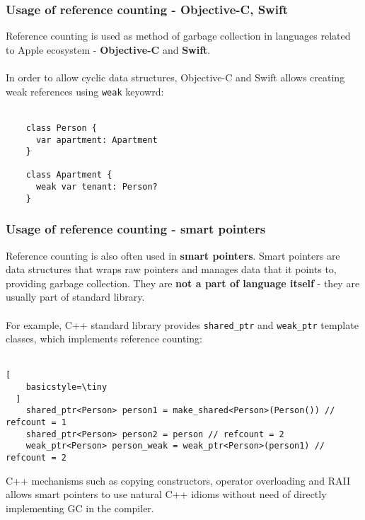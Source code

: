 \documentclass[presentation]{beamer}
\begin{document}
\begin{frame}[fragile]
  \frametitle{Usage of reference counting - Objective-C, Swift} 
  \justifying
  Reference counting is used as method of garbage collection in languages related to Apple ecosystem - \textbf{Objective-C} and \textbf{Swift}.
  \\~\\
  In order to allow cyclic data structures, Objective-C and Swift allows creating weak references using \texttt{weak} keyowrd:
  \\~\\
  \begin{lstlisting}
    class Person {
      var apartment: Apartment
    }

    class Apartment {
      weak var tenant: Person?
    }\end{lstlisting}
\end{frame}

\begin{frame}[fragile]
  \frametitle{Usage of reference counting - smart pointers} 
  \justifying
  Reference counting is also often used in \textbf{smart pointers}. Smart pointers are data structures that wraps raw pointers and manages data that it points to, providing garbage collection. They are \textbf{not a part of language itself} - they are usually part of standard library. 
  \\~\\
  For example, C++ standard library provides \texttt{shared\_ptr} and \texttt{weak\_ptr} template classes, which implements reference counting:
  \\~\\
  \begin{lstlisting}[
    basicstyle=\tiny
  ]
    shared_ptr<Person> person1 = make_shared<Person>(Person()) // refcount = 1
    shared_ptr<Person> person2 = person // refcount = 2
    weak_ptr<Person> person_weak = weak_ptr<Person>(person1) // refcount = 2\end{lstlisting}
  C++ mechanisms such as copying constructors, operator overloading and RAII allows smart pointers to use natural C++ idioms without need of directly implementing GC in the compiler.
\end{frame}
\end{document}
